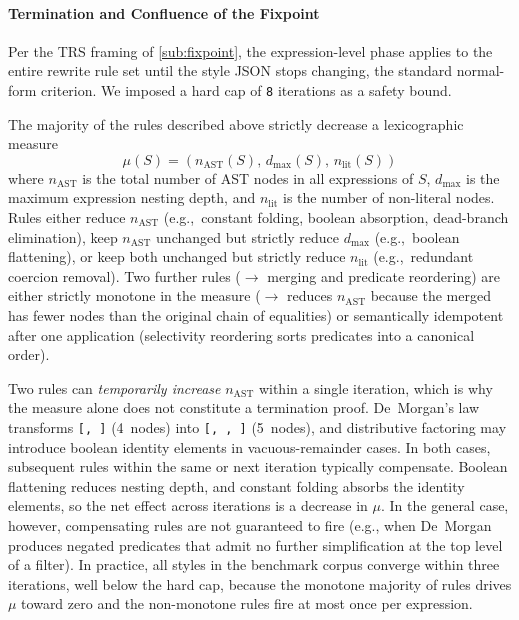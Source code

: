 \paragraph{Termination and Confluence of the Fixpoint}
Per the \ac{TRS} framing of \cref{sub:fixpoint}, the expression-level phase applies to the entire rewrite rule set until the style \ac{JSON} stops changing, the standard normal-form criterion.
We imposed a hard cap of \texttt{8} iterations as a safety bound.

The majority of the rules described above strictly decrease a lexicographic measure
\begin{equation}\label{eq:termination_measure}
    \mu(S) = (n_{\mathrm{AST}}(S),\, d_{\max}(S),\, n_{\mathrm{lit}}(S))
\end{equation}
where $n_{\mathrm{AST}}$ is the total number of \ac{AST} nodes in all expressions of $S$, $d_{\max}$ is the maximum expression nesting depth, and $n_{\mathrm{lit}}$ is the number of non-literal nodes.
Rules either reduce $n_{\mathrm{AST}}$ (e.g.,\ constant folding, boolean absorption, dead-branch elimination), keep $n_{\mathrm{AST}}$ unchanged but strictly reduce $d_{\max}$ (e.g.,\ boolean flattening), or keep both unchanged but strictly reduce $n_{\mathrm{lit}}$ (e.g.,\ redundant coercion removal).
Two further rules ($\to$ merging and predicate reordering) are either strictly monotone in the measure ($\to$ reduces $n_{\mathrm{AST}}$ because the merged  has fewer nodes than the original chain of equalities) or semantically idempotent after one application (selectivity reordering sorts predicates into a canonical order).

Two rules can \emph{temporarily increase} $n_{\mathrm{AST}}$ within a single iteration, which is why the measure alone does not constitute a termination proof.
De~Morgan's law transforms \texttt{[, ]} (4~nodes) into \texttt{[, , ]} (5~nodes), and distributive factoring may introduce boolean identity elements in vacuous-remainder cases.
In both cases, subsequent rules within the same or next iteration typically compensate.
Boolean flattening reduces nesting depth, and constant folding absorbs the identity elements, so the net effect across iterations is a decrease in $\mu$.
In the general case, however, compensating rules are not guaranteed to fire (e.g., when De~Morgan produces negated predicates that admit no further simplification at the top level of a filter).
In practice, all styles in the benchmark corpus converge within three iterations, well below the hard cap, because the monotone majority of rules drives $\mu$ toward zero and the non-monotone rules fire at most once per expression.

